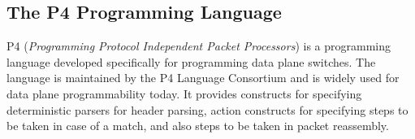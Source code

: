 \subsection{The P4 Programming Language}

P4 (\textit{Programming Protocol Independent Packet Processors}) is a programming language developed specifically for programming data plane switches. The language is maintained by the P4 Language Consortium and is widely used for data plane programmability today. It provides constructs for specifying deterministic parsers for header parsing, action constructs for specifying steps to be taken in case of a match, and also steps to be taken in packet reassembly.







